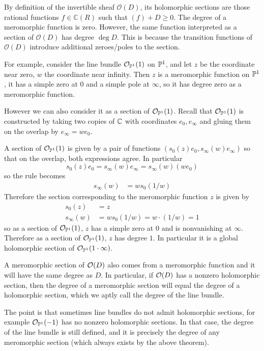\documentclass[12pt]{article}
\begin{document}
\begin{remark}
    By definition of the invertible sheaf $\mathcal{O}(D)$, its holomorphic sections are those rational functions $f \in \mathbb{C}(R)$ such that $(f) + D \geq 0$. The degree of a meromorphic function is zero. However, the same function interpreted as a section of $\mathcal{O}(D)$ has degree $\deg D$. This is because the transition functions of $\mathcal{O}(D)$ introduce additional zeroes/poles to the section.

    For example, consider the line bundle $\cO_{\P^1}(1)$ on $\P^1$, and let $z$ be the coordinate near zero, $w$ the coordinate near infinity. Then $z$ is a meromorphic function on $\P^1$, it has a simple zero at $0$ and a simple pole at $\infty$, so it has degree zero as a meromorphic function. 

    However we can also consider it as a section of $\cO_{\P^1}(1)$. Recall that $\cO_{\P^1}(1)$ is constructed by taking two copies of $\C$ with coordinates $e_0, e_\infty$ and gluing them on the overlap by $e_\infty = w e_0$. 

    A section of $\cO_{\P^1}(1)$ is given by a pair of functions $(s_0(z)e_0, s_\infty(w)e_\infty)$ so that on the overlap, both expressions agree. In particular \[s_0(z)e_0 = s_\infty(w)e_\infty = s_\infty(w)(w e_0)\] so the rule becomes \begin{align*}
        s_\infty(w) & = ws_0(1/w)
    \end{align*}
    Therefore the section corresponding to the meromorphic function $z$ is given by \begin{align*}
        s_0(z) & = z \\
        s_\infty(w) & = w s_0(1/w) = w \cdot (1/w) = 1
    \end{align*} so as a section of $\cO_{\P^1}(1)$, $z$ has a simple zero at $0$ and is nonvanishing at $\infty$. Therefore as a section of $\cO_{\P^1}(1)$, $z$ has degree $1$. In particular it is a global holomorphic section of $\cO_{\P^1}(1\cdot \infty)$.

    A meromorphic section of $\cO(D)$ also comes from a meromorphic function and it will have the same degree as $D$. In particular, if $\cO(D)$ has a nonzero holomorphic section, then the degree of a meromorphic section will equal the degree of a holomorphic section, which we aptly call the degree of the line bundle.

    The point is that sometimes line bundles do not admit holomorphic sections, for example $\cO_{\P^1}(-1)$ has no nonzero holomorphic sections. In that case, the degree of the line bundle is still defined, and it is precisely the degree of any meromorphic section (which always exists by the above theorem). 
    

\end{remark}
\end{document}
